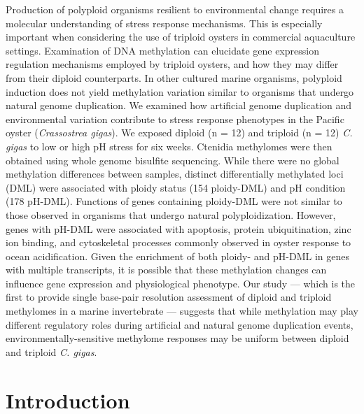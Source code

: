 \documentclass [11pt, proquest] {uwthesis}[2015/03/03]
\begin{document}
Production of polyploid organisms resilient to environmental change requires a molecular understanding of stress response mechanisms. This is especially important when considering the use of triploid oysters in commercial aquaculture settings. Examination of DNA methylation can elucidate gene expression regulation mechanisms employed by triploid oysters, and how they may differ from their diploid counterparts. In other cultured marine organisms, polyploid induction does not yield methylation variation similar to organisms that undergo natural genome duplication. We examined how artificial genome duplication and environmental variation contribute to stress response phenotypes in the Pacific oyster (\emph{Crassostrea gigas}). We exposed diploid (n = 12) and triploid (n = 12) \emph{C. gigas} to low or high pH stress for six weeks. Ctenidia methylomes were then obtained using whole genome bisulfite sequencing. While there were no global methylation differences between samples, distinct differentially methylated loci (DML) were associated with ploidy status (154 ploidy-DML) and pH condition (178 pH-DML). Functions of genes containing ploidy-DML were not similar to those observed in organisms that undergo natural polyploidization. However, genes with pH-DML were associated with apoptosis, protein ubiquitination, zinc ion binding, and cytoskeletal processes commonly observed in oyster response to ocean acidification. Given the enrichment of both ploidy- and pH-DML in genes with multiple transcripts, it is possible that these methylation changes can influence gene expression and physiological phenotype. Our study --- which is the first to provide single base-pair resolution assessment of diploid and triploid methylomes in a marine invertebrate --- suggests that while methylation may play different regulatory roles during artificial and natural genome duplication events, environmentally-sensitive methylome responses may be uniform between diploid and triploid \emph{C. gigas}.

\hypertarget{introduction-4}{%
\section{Introduction}\label{introduction-4}}
\end{document}
